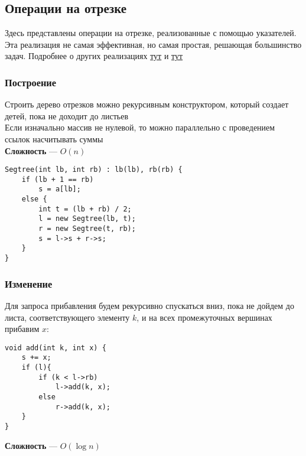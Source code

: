 \documentclass[a4paper]{article}
\begin{document}
\subsection{Операции на отрезке}
Здесь представлены операции на отрезке, реализованные с помощью указателей. Эта реализация не самая эффективная, но самая простая, решающая большинство задач. Подробнее о других реализациях \href{http://e-maxx.ru/algo/segment_tree}{тут} и \href{https://codeforces.com/blog/entry/18051}{тут}
\subsubsection{Построение}
Строить дерево отрезков можно рекурсивным конструктором, который создает детей, пока не доходит до листьев\\[2mm]
\indent Если изначально массив не нулевой, то можно параллельно с проведением ссылок насчитывать суммы\\[2mm]
\indent \textbf{Сложность} — $O(n)$
\begin{lstlisting}
Segtree(int lb, int rb) : lb(lb), rb(rb) {
    if (lb + 1 == rb)
        s = a[lb];
    else {
        int t = (lb + rb) / 2;
        l = new Segtree(lb, t);
        r = new Segtree(t, rb);
        s = l->s + r->s;
    }
}
\end{lstlisting}

\subsubsection{Изменение}
Для запроса прибавления будем рекурсивно спускаться вниз, пока не дойдем до листа, соответствующего элементу $k$, и на всех промежуточных вершинах прибавим $x$:
\begin{lstlisting}
void add(int k, int x) {
    s += x;
    if (l){
        if (k < l->rb)
            l->add(k, x);
        else
            r->add(k, x);
    }
}
\end{lstlisting}
\indent \textbf{Сложность} — $O(\log n)$
\end{document}
